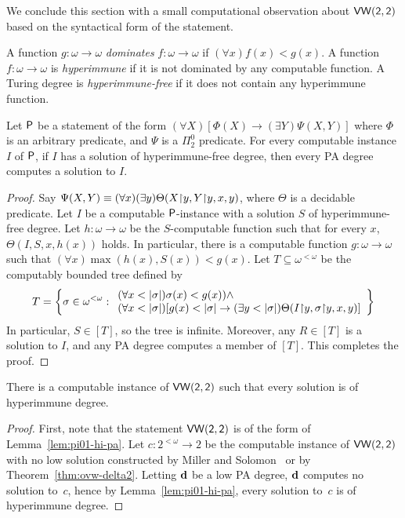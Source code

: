 We conclude this section with a small computational observation about $\sf{VW}(2,2)$ based on the syntactical form of the statement.

\begin{definition}
	A function $g : \omega \to \omega$ \emph{dominates}
	$f : \omega \to \omega$ if $(\forall x)f(x) < g(x)$.
	A function $f : \omega \to \omega$ is \emph{hyperimmune}
	if it is not dominated by any computable function.
	A Turing degree is \emph{hyperimmune-free} if it does not contain any hyperimmune function.
\end{definition}

\begin{lemma}[Folklore]\label{lem:pi01-hi-pa}
Let $\mathsf{P}$ be a statement of the form $(\forall X)[\Phi(X) \rightarrow (\exists Y)\Psi(X, Y)]$ where $\Phi$ is an arbitrary predicate, and $\Psi$ is a $\Pi^0_2$ predicate. For every computable instance $I$ of $\mathsf{P}$, if $I$ has a solution of hyperimmune-free degree, then every PA degree computes a solution to $I$.
\end{lemma}
\begin{proof}
	Say $\Psi(X, Y) \equiv (\forall x)(\exists y)\Theta(X {\upharpoonright} y, Y {\upharpoonright} y, x, y)$, where $\Theta$ is a decidable predicate.
	Let $I$ be a computable $\mathsf{P}$-instance with a solution $S$ of hyperimmune-free degree. 
	Let $h : \omega \to \omega$ be the $S$-computable function such that for every $x$, $\Theta(I, S, x, h(x))$ holds. In particular, there is a computable function $g : \omega \to \omega$ such that $(\forall x)\max (h(x), S(x)) < g(x)$. Let $T \subseteq \omega^{<\omega}$ be the computably bounded tree defined by
	$$
	T = \left\{ \sigma \in \omega^{<\omega} : \begin{array}{l}
 		(\forall x < |\sigma|)\sigma(x) < g(x)) \wedge  \\
 		(\forall x < |\sigma|)[g(x) < |\sigma| \rightarrow (\exists y < |\sigma|)\Theta(I {\upharpoonright} y, \sigma {\upharpoonright} y, x, y)]
 \end{array} \right\}
	$$
	In particular, $S \in [T]$, so the tree is infinite. Moreover,
	any $R \in [T]$ is a solution to $I$, and any PA degree computes a member
	of $[T]$. This completes the proof.
\end{proof}

\begin{corollary}
	There is a computable instance of $\sf{VW}(2,2)$ such that
	every solution is of hyperimmune degree.
\end{corollary}
\begin{proof}
	First, note that the statement $\sf{VW}(2,2)$ is of the form of Lemma~\ref{lem:pi01-hi-pa}.
	Let $c : 2^{<\omega} \to 2$ be the computable
	instance of $\sf{VW}(2,2)$ with no low solution constructed by Miller and Solomon~\cite{Miller2004Effectiveness} or by Theorem~\ref{thm:ovw-delta2}. Letting $\mathbf{d}$ be a low PA degree, $\mathbf{d}$ computes no solution to~$c$, hence by Lemma~\ref{lem:pi01-hi-pa}, every solution to~$c$ is of hyperimmune degree.
\end{proof}

